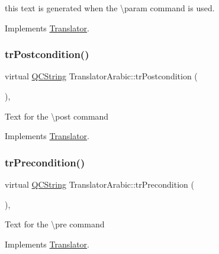this text is generated when the \textbackslash{}param command is used. 

Implements \mbox{\hyperlink{class_translator}{Translator}}.

\mbox{\label{class_translator_arabic_a409bdca2f430c6ef7addadf3e11ad8b4}} 
\subsubsection{\texorpdfstring{trPostcondition()}{trPostcondition()}}
{\footnotesize\ttfamily virtual \mbox{\hyperlink{class_q_c_string}{Q\+C\+String}} Translator\+Arabic\+::tr\+Postcondition (\begin{DoxyParamCaption}{ }\end{DoxyParamCaption})\hspace{0.3cm}{\ttfamily [inline]}, {\ttfamily [virtual]}}

Text for the \textbackslash{}post command 

Implements \mbox{\hyperlink{class_translator}{Translator}}.

\mbox{\label{class_translator_arabic_a7ec599787534ebd84dda9bb8ed77d805}} 
\subsubsection{\texorpdfstring{trPrecondition()}{trPrecondition()}}
{\footnotesize\ttfamily virtual \mbox{\hyperlink{class_q_c_string}{Q\+C\+String}} Translator\+Arabic\+::tr\+Precondition (\begin{DoxyParamCaption}{ }\end{DoxyParamCaption})\hspace{0.3cm}{\ttfamily [inline]}, {\ttfamily [virtual]}}

Text for the \textbackslash{}pre command 

Implements \mbox{\hyperlink{class_translator}{Translator}}.

\mbox{\label{class_translator_arabic_afbabf4ac8a1961d481c1bf31bcce97ae}} 
